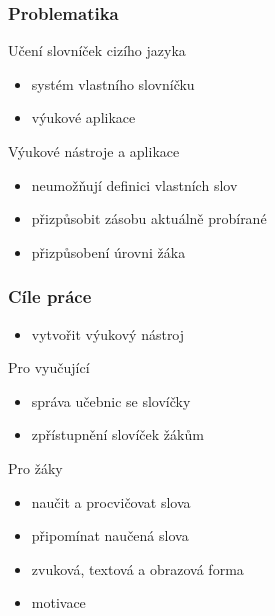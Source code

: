 \begin{frame}[t]
    \frametitle{Problematika}
    \begin{block}{Učení slovníček cizího jazyka}
    \begin{itemize}[<+->]
        \item systém vlastního slovníčku
        \item výukové aplikace
    \end{itemize}
    \end{block}
    
    \begin{block}{Výukové nástroje a aplikace}
    \begin{itemize}[<+->]
        \item neumožňují definici vlastních slov
        \item přizpůsobit zásobu aktuálně probírané
        \item přizpůsobení úrovni žáka
    \end{itemize}
    \end{block}
\end{frame}

\begin{frame}[c]
    \frametitle{Cíle práce}
    \begin{itemize}[<+->]
        \item vytvořit výukový nástroj
    \end{itemize}
    
    \begin{block}{Pro vyučující}
    \begin{itemize}[<+->]
        \item správa učebnic se slovíčky
        \item zpřístupnění slovíček žákům
    \end{itemize}
    \end{block}

    \begin{block}{Pro žáky}
        \begin{itemize}[<+->]
            \item naučit a procvičovat slova
            \item připomínat naučená slova
            \item zvuková, textová a obrazová forma
            \item motivace
        \end{itemize}
    \end{block}
\end{frame}


